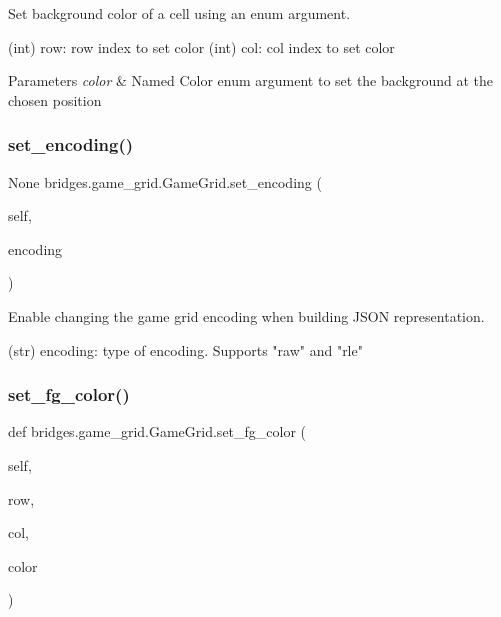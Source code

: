 Set background color of a cell using an enum argument. 

\begin{DoxyVerb}       (int) row: row index to set color
       (int) col: col index to set color
\end{DoxyVerb}
 
\begin{DoxyParams}{Parameters}
{\em color} & Named Color enum argument to set the background at the chosen position \\
\hline
\end{DoxyParams}
\mbox{\label{classbridges_1_1game__grid_1_1_game_grid_adb8fb6a915984c798cf1a59fcd5122f7}} 
\subsubsection{\texorpdfstring{set\_encoding()}{set\_encoding()}}
{\footnotesize\ttfamily  None bridges.\+game\+\_\+grid.\+Game\+Grid.\+set\+\_\+encoding (\begin{DoxyParamCaption}\item[{}]{self,  }\item[{str}]{encoding }\end{DoxyParamCaption})}



Enable changing the game grid encoding when building J\+S\+ON representation. 

\begin{DoxyVerb}       (str) encoding: type of encoding. Supports "raw" and "rle"
\end{DoxyVerb}
 \mbox{\label{classbridges_1_1game__grid_1_1_game_grid_a8dd0ee88cadffb4f8645307749120ae7}} 
\subsubsection{\texorpdfstring{set\_fg\_color()}{set\_fg\_color()}}
{\footnotesize\ttfamily def bridges.\+game\+\_\+grid.\+Game\+Grid.\+set\+\_\+fg\+\_\+color (\begin{DoxyParamCaption}\item[{}]{self,  }\item[{int}]{row,  }\item[{int}]{col,  }\item[{}]{color }\end{DoxyParamCaption})}



